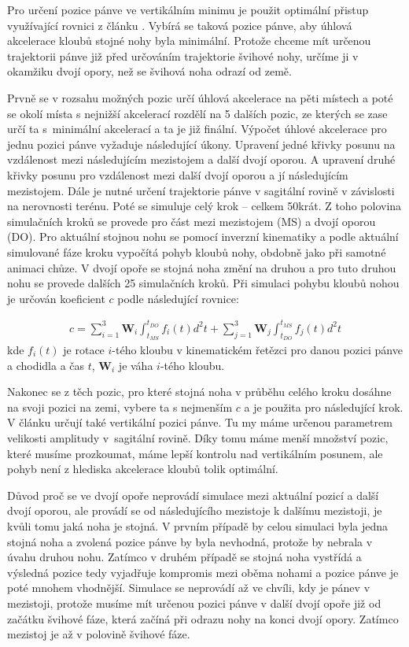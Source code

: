 Pro určení pozice pánve ve vertikálním minimu je použit optimální přistup využívající rovnici z článku \cite{chung}. Vybírá se taková pozice pánve, aby úhlová akce\-le\-ra\-ce kloubů stojné nohy byla minimální. Protože chceme mít určenou trajektorii pánve již před určová\-ním trajektorie švihové nohy, určíme ji v okamžiku dvojí opory, než se švihová noha odrazí od země.

Prvně se v rozsahu možných pozic určí úhlová akcelerace na pěti místech a poté se okolí místa s nejnižší akcelerací rozdělí na 5 dalších pozic, ze kterých se zase určí ta s~minimální akcelerací a ta je již finální. Výpočet úhlové akcelerace pro jednu pozici pánve vyžaduje následující úkony. Upravení jedné křivky posunu na vzdálenost mezi následujícím mezistojem a další dvojí oporou. A upravení druhé křivky posunu pro vzdálenost mezi další dvojí oporou a jí následujícím mezistojem. Dále je nutné určení trajektorie pánve v sagitální rovině v závislosti na nerovnosti terénu. Poté se simuluje celý krok -- celkem 50krát. Z toho polovina simulačních kroků se provede pro část mezi mezistojem (MS) a dvojí oporou (DO). Pro aktuální stojnou nohu se pomocí inverzní kinematiky a podle aktuální simulované fáze kroku vypočítá pohyb kloubů nohy, obdobně jako při samotné animaci chůze. V dvojí opoře se stojná noha změní na druhou a pro tuto druhou nohu se provede dalších 25 simulačních kroků. Při simulaci pohybu kloubů nohou je určován koeficient $c$ podle následující rovnice:

\begin{eqnarray}
c = \sum_{i=1}^{3} \mathbf{W}_i \int_{t_{MS}}^{t_{DO}}f_i(t)d^2t + \sum_{j=1}^{3} \mathbf{W}_j \int_{t_{DO}}^{t_{MS}}f_j(t)d^2t 
\label{eq:coefficient}
\end{eqnarray}
kde $f_i(t)$ je rotace $i$-tého kloubu v kinematickém řetězci pro danou pozici pánve a chodidla a čas $t$, $\mathbf{W}_i$ je váha $i$-tého kloubu.

Nakonec se z těch pozic, pro které stojná noha v průběhu celého kroku dosáhne na svoji pozici na zemi, vybere ta s nejmenším $c$ a je použita pro následující krok. V článku \cite{chung} určují také vertikální pozici pánve. Tu my máme určenou parametrem velikosti amplitudy v~sagitální rovině. Díky tomu máme menší množství pozic, které musíme prozkoumat, máme lepší kontrolu nad vertikálním posunem, ale pohyb není z hlediska akcelerace kloubů tolik optimální.

Důvod proč se ve dvojí opoře neprovádí simulace mezi aktuální pozicí a další dvojí oporou, ale provádí se od následujícího mezistoje k dalšímu mezistoji, je kvůli tomu jaká noha je stojná. V prvním případě by celou simulaci byla jedna stojná noha a zvolená pozice pánve by byla nevhodná, protože by nebrala v úvahu druhou nohu. Zatímco v druhém případě se stojná noha vystřídá a výsledná pozice tedy vyjadřuje kompromis mezi oběma nohami a pozice pánve je poté mnohem vhodnější. Simulace se neprovádí až ve chvíli, kdy je pánev v mezistoji, protože musíme mít určenou pozici pánve v další dvojí opoře již od začátku švihové fáze, která začíná při odrazu nohy na konci dvojí opory. Zatímco mezistoj je až v polovině švihové fáze.

